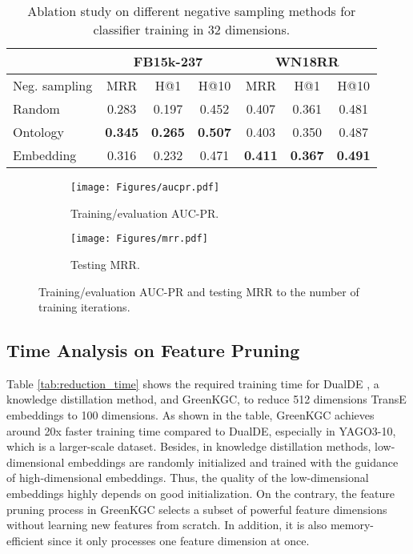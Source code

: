 \documentclass{article}
\begin{document}
\begin{table}[t]
\setlength\tabcolsep{3pt}
\centering
\begin{tabular}{l | c  c  c | c  c  c}
\hline
& \multicolumn{3}{c|}{\textbf{FB15k-237}} & \multicolumn{3}{c}{\textbf{WN18RR}} \\
\hline
Neg. sampling & MRR & H@1 & H@10 & MRR & H@1 & H@10\\
\hline
Random        & 0.283 & 0.197 & 0.452 & 0.407 & 0.361 & 0.481 \\
Ontology      & {\bf 0.345} & {\bf 0.265} & {\bf 0.507} & 0.403 & 0.350 & 0.487 \\
Embedding     & 0.316 & 0.232 & 0.471 & {\bf 0.411} & {\bf 0.367} & {\bf 0.491} \\
\hline
\end{tabular}
\caption{Ablation study on different negative sampling methods for classifier 
training in 32 dimensions.}\label{tab:neg}
\end{table}


\begin{figure}[t]
\centering
     \begin{subfigure}[b]{0.48\textwidth}
         \centering
         \texttt{[image: Figures/aucpr.pdf]}
         \caption{Training/evaluation AUC-PR.} \label{fig:aucpr}
     \end{subfigure}
\begin{subfigure}[b]{0.48\textwidth}
         \centering
         \texttt{[image: Figures/mrr.pdf]}
         \caption{Testing MRR.} \label{fig:mrr}
     \end{subfigure}
\caption{\color{black} Training/evaluation AUC-PR and testing MRR to the number of training iterations.}
\label{fig:training}
\end{figure}



\subsection{Time Analysis on Feature Pruning} Table 
\ref{tab:reduction_time} shows the required training time for DualDE 
\citep{zhu2022dualde}, a knowledge distillation method, and GreenKGC, to reduce 
512 dimensions TransE embeddings to 100 dimensions. As shown in the table, GreenKGC 
achieves around 20x faster training time compared to DualDE, 
especially in YAGO3-10, which is a larger-scale dataset. Besides, in knowledge 
distillation methods, low-dimensional embeddings are randomly initialized and 
trained with the guidance of high-dimensional embeddings. Thus, the quality of 
the low-dimensional embeddings highly depends on good initialization. On the 
contrary, the feature pruning process in GreenKGC selects a subset of powerful 
feature dimensions without learning new features from scratch. In addition, it 
is also memory-efficient since it only processes one feature dimension at 
once.
\end{document}
